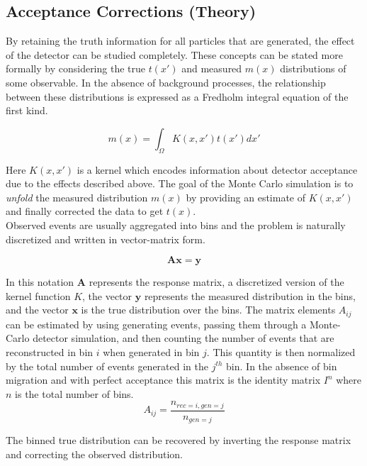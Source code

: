 \subsection{Acceptance Corrections (Theory)}
By retaining the truth information for all particles that are generated, the effect of the detector can be studied completely.  These concepts can be stated more formally by considering the true $t(x')$ and measured $m(x)$ distributions of some observable.  In the absence of background processes, the relationship between these distributions is expressed as a Fredholm integral equation of the first kind.

\begin{equation}
	m(x) = \int_{\Omega} K(x,x') t(x') dx'
\end{equation}
    
Here $K(x,x')$ is a kernel which encodes information about detector acceptance due to the effects described above.  The goal of the Monte Carlo simulation is to \textit{unfold} the measured distribution $m(x)$ by providing an estimate of $K(x,x')$ and finally corrected the data to get $t(x)$.\\
Observed events are usually aggregated into bins and the problem is naturally discretized and written in vector-matrix form.

\begin{equation}
	\mathbf{A} \mathbf{x} = \mathbf{y}
\end{equation}        

In this notation $\mathbf{A}$ represents the response matrix, a discretized version of the kernel function $K$, the vector $\mathbf{y}$ represents the measured distribution in the bins, and the vector $\mathbf{x}$ is the true distribution over the bins.  The matrix elements $A_{ij}$ can be estimated by using generating events, passing them through a Monte-Carlo detector simulation, and then counting the number of events that are reconstructed in bin $i$ when generated in bin $j$.  This quantity is then normalized by the total number of events generated in the $j^{th}$ bin.  In the absence of bin migration and with perfect acceptance this matrix is the identity matrix $I^{n}$ where $n$ is the total number of bins. \\

\begin{equation}
  A_{ij} = \frac{n_{rec=i, gen=j}}{n_{gen=j}}
\end{equation}

The binned true distribution can be recovered by inverting the response matrix and correcting the observed distribution.

